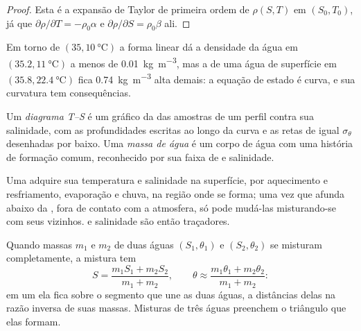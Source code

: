 \begin{proof}
Esta é a expansão de Taylor de primeira ordem de $\rho(S, T)$ em $(S_0, T_0)$, já que
$\partial\rho/\partial T = -\rho_0\alpha$ e $\partial\rho/\partial S =
\rho_0\beta$ ali.
\end{proof}

Em torno de $(35, \qty{10}{\celsius})$ a forma linear dá a densidade da água em
$(35.2, \qty{11}{\celsius})$ a menos de \qty{0.01}{kg.m^{-3}}, mas a de uma água de superfície em
$(35.8, \qty{22.4}{\celsius})$ fica \qty{0.74}{kg.m^{-3}} alta demais: a equação de estado é
curva, e sua curvatura tem consequências.

\begin{definition}\label{def:b1:fluid-envelopes-structure:ts-diagram}
Um \emph{diagrama T--S} é um gráfico da  das amostras
de um perfil contra sua salinidade, com as profundidades escritas ao longo da curva e as retas de
igual $\sigma_\theta$ desenhadas por baixo. Uma \emph{massa de água} é um
corpo de água com uma história de formação comum, reconhecido por sua faixa de  e salinidade.
\end{definition}

Uma  adquire sua temperatura e salinidade na superfície, por aquecimento e
resfriamento, evaporação e chuva, na região onde se forma; uma vez que afunda abaixo da , fora de contato com a atmosfera, só pode mudá-las misturando-se com seus vizinhos.
 e salinidade são então traçadores.

\begin{proposition}\label{prop:b1:fluid-envelopes-structure:mixing}
Quando massas $m_1$ e $m_2$ de duas águas $(S_1, \theta_1)$ e $(S_2, \theta_2)$ se misturam
completamente, a mistura tem
\[
  S = \frac{m_1 S_1 + m_2 S_2}{m_1 + m_2},\qquad
  \theta \approx \frac{m_1 \theta_1 + m_2 \theta_2}{m_1 + m_2}:
\]
em um  ela fica sobre o segmento que une as duas águas, a distâncias delas na razão
inversa de suas massas. Misturas de três águas preenchem o triângulo que elas formam.
\end{proposition}

